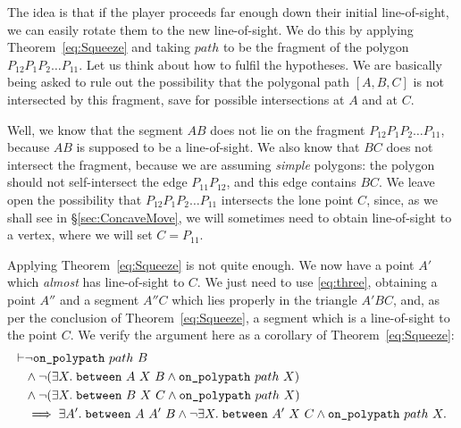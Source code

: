 The idea is that if the player proceeds far enough down their initial line-of-sight, we can easily rotate them to the new line-of-sight. We do this by applying Theorem~\ref{eq:Squeeze} and taking $path$ to be the fragment of the polygon $P_{12}P_1P_2\ldots P_{11}$. Let us think about how to fulfil the hypotheses. We are basically being asked to rule out the possibility that the polygonal path $[A,B,C]$ is not intersected by this fragment, save for possible intersections at $A$ and at $C$. 

Well, we know that the segment $AB$ does not lie on the fragment $P_{12}P_1P_2\ldots P_{11}$, because $AB$ is supposed to be a line-of-sight. We also know that $BC$ does not intersect the fragment, because we are assuming \emph{simple} polygons: the polygon should not self-intersect the edge $P_{11}P_{12}$, and this edge contains $BC$. We leave open the possibility that $P_{12}P_1P_2\ldots P_{11}$ intersects the lone point $C$, since, as we shall see in \S\ref{sec:ConcaveMove}, we will sometimes need to obtain line-of-sight to a vertex, where we will set $C=P_{11}$.

Applying Theorem~\ref{eq:Squeeze} is not quite enough. We now have a point $A'$ which \emph{almost} has line-of-sight to $C$. We just need to use \ref{eq:three}, obtaining a point $A''$ and a segment $A''C$ which lies properly in the triangle $A'BC$, and, as per the conclusion of Theorem~\ref{eq:Squeeze}, a segment which is a line-of-sight to the point $C$. We verify the argument here as a corollary of Theorem~\ref{eq:Squeeze}:
\begin{equation}\label{eq:Squeeze2}
  \begin{aligned}
\vdash    &\neg\texttt{on\_polypath}\ path\ B\\
    &\wedge \neg(\exists X.\; \texttt{between}\ A\ X\ B \wedge \texttt{on\_polypath}\ path\ X)\\
    &\wedge \neg(\exists X.\; \texttt{between}\ B\ X\ C \wedge \texttt{on\_polypath}\ path\ X)\\
    &\implies \exists A'.\; \texttt{between}\ A\ A'\ B \wedge \neg\exists X.\; \texttt{between}\ A'\ X\ C \wedge \texttt{on\_polypath}\ path\ X.
  \end{aligned}
\end{equation}

